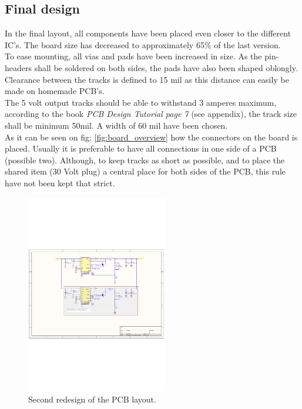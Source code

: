 \subsection{Final design}
In the final layout, all components have been placed even closer to the different IC's. The board size has decreased to approximately 65\% of the last version. 
\\ To ease mounting, all vias and pads have been increased in size. As the pin-headers shall be soldered on both sides, the pads have also been shaped oblongly. Clearance between the tracks is defined to 15 mil as this distance can easily be made on homemade PCB's. 
\\ The 5 volt output tracks should be able to withstand 3 amperes maximum, according to the book \textit{PCB Design Tutorial page 7} (see appendix), the track size shall be minimum 50mil. A width of 60 mil have been chosen. 
\\ As it can be seen on fig: \ref{fig:board_overview} how the connectors on the board is placed. Usually it is preferable to have all connections in one side of a PCB (possible two). Although, to keep tracks as short as possible, and to place the shared item (30 Volt plug) a central place for both sides of the PCB, this rule have not been kept that strict.



\begin{figure}[H]
	\begin{centering}
		 \includegraphics[width=0.55\textwidth,page=3,angle=0]{images/SIG60_v0_4}
		\caption{Second redesign of the PCB layout.}
	\end{centering}
\end{figure}


